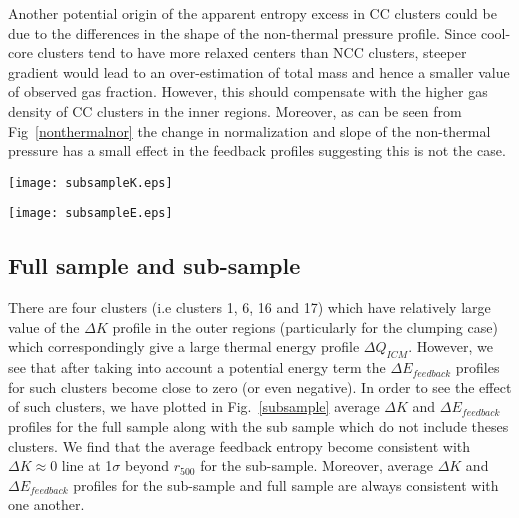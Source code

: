 \documentclass[a4paper,fleqn,usenatbib]{mnras}
\begin{document}
Another potential origin of the apparent entropy excess in CC clusters could be due to the differences in the shape of the non-thermal pressure profile. Since cool-core clusters tend to have more relaxed centers than NCC clusters, steeper gradient would lead to an over-estimation of total mass and hence a smaller value of observed gas fraction. However, this should compensate  with the higher gas density of CC clusters in the inner regions. Moreover, as can be seen from Fig~\ref{nonthermalnor} the change in normalization and slope of the non-thermal pressure has a small effect in the feedback profiles suggesting this is not the case.
\begin{figure*}
\begin{minipage}{8.5cm}
 \texttt{[image: subsampleK.eps]}
\end{minipage}
\begin{minipage}{8.5cm}
 \texttt{[image: subsampleE.eps]}
\end{minipage}   
\caption{Comparison of feedback profiles for sub sample and full sample. The error bars are given at  1$\sigma$ level.}
\label{subsample}
\end{figure*}
\subsection{Full sample and sub-sample}
There are four clusters (i.e clusters 1, 6, 16 and 17) which have relatively large value of the $\Delta K$ profile in the outer regions (particularly for the clumping case) which correspondingly give a large thermal energy profile $\Delta Q_{ICM}$. However, we see that after taking into account  a potential energy term the  $\Delta E_{feedback}$ profiles for such clusters become close to zero (or even negative).
In order to see the effect of such clusters, we have plotted in Fig.~\ref{subsample} average $\Delta K$ and $\Delta E_{feedback}$ profiles for the full sample along with the sub sample which do not include theses clusters. We find that the average feedback entropy become consistent with $\Delta K\approx0$ line at 1$\sigma$ beyond $r_{500}$ for the sub-sample.  Moreover, average $\Delta K$ and $\Delta E_{feedback}$ profiles for the sub-sample and full sample are  always consistent with one another.
\end{document}
